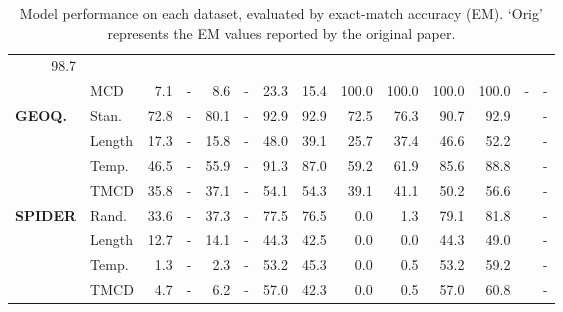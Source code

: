 \begin{table}[]
\begin{tabular}{llrlrlrrrrrrll}
  \multicolumn{1}{r}{98.7} \\
 &
  MCD &
  7.1 &
  - &
  8.6 &
  - &
  23.3 &
  15.4 &
  100.0 &
  100.0 &
  100.0 &
  100.0 &
  - &
  - \\
  \midrule
\multirow{4}{*}{\textbf{GEOQ.}} &
  Stan. &
  72.8 &
  - &
  80.1 &
  - &
  92.9 &
  92.9 &
  72.5 &
  76.3 &
  90.7 &
  92.9 &
   &
  - \\
 &
  Length &
  17.3 &
  - &
  15.8 &
  - &
  48.0 &
  39.1 &
  25.7 &
  37.4 &
  46.6 &
  52.2 &
   &
  - \\
 &
  Temp. &
  46.5 &
  - &
  55.9 &
  - &
  91.3 &
  87.0 &
  59.2 &
  61.9 &
  85.6 &
  88.8 &
   &
  - \\
 &
  TMCD &
  35.8 &
  - &
  37.1 &
  - &
  54.1 &
  54.3 &
  39.1 &
  41.1 &
  50.2 &
  56.6 &
   &
  - \\
  \midrule
\multirow{4}{*}{\textbf{SPIDER}} &
  Rand. &
  33.6 &
  - &
  37.3 &
  - &
  77.5 &
  76.5 &
  0.0 &
  1.3 &
  79.1 &
  81.8 &
   &
  - \\
 &
  Length &
  12.7 &
  - &
  14.1 &
  - &
  44.3 &
  42.5 &
  0.0 &
  0.0 &
  44.3 &
  49.0 &
   &
  - \\
 &
  Temp. &
  1.3 &
  - &
  2.3 &
  - &
  53.2 &
  45.3 &
  0.0 &
  0.5 &
  53.2 &
  59.2 &
   &
  - \\
 &
  TMCD &
  4.7 &
  - &
  6.2 &
  - &
  57.0 &
  42.3 &
  0.0 &
  0.5 &
  57.0 &
  60.8 &
   &
  - \\
  \bottomrule
\end{tabular}
\caption{Model performance on each dataset, evaluated by exact-match accuracy (EM). `Orig' represents the EM values reported by the original paper.}
\label{tab:performance}
\end{table}
